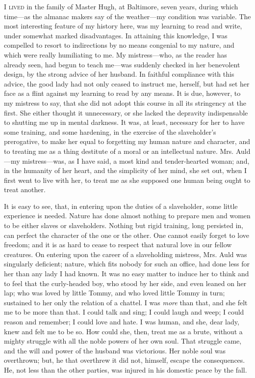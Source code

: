 \textsc{I lived} in the family of Master Hugh, at Baltimore, seven
years, during which time---as the almanac makers say of the weather---my
condition was variable. The most interesting feature of my history here,
was my learning to read and write, under somewhat marked disadvantages.
In attaining this knowledge, I was compelled to resort to indirections
by no means congenial to my nature, and which were really humiliating to
me. My mistress---who, as the reader has already seen, had begun to
teach me---was suddenly checked in her benevolent design, by the strong
advice of her husband. In faithful compliance with this advice, the good
lady had not only ceased to instruct me, herself, but had set her face
as a flint against my learning to read by any means. It is due,
{\protect\hypertarget{152}{}{}}however, to my mistress to say, that she
did not adopt this course in all its stringency at the first. She either
thought it unnecessary, or she lacked the depravity indispensable to
shutting me up in mental darkness. It was, at least, necessary for her
to have some training, and some hardening, in the exercise of the
slaveholder's prerogative, to make her equal to forgetting my human
nature and character, and to treating me as a thing destitute of a moral
or an intellectual nature. Mrs. Auld---my mistress---was, as I have
said, a most kind and tender-hearted woman; and, in the humanity of her
heart, and the simplicity of her mind, she set out, when I first went to
live with her, to treat me as she supposed one human being ought to
treat another.

It is easy to see, that, in entering upon the duties of a slaveholder,
some little experience is needed. Nature has done almost nothing to
prepare men and women to be either slaves or slaveholders. Nothing but
rigid training, long persisted in, can perfect the character of the one
or the other. One cannot easily forget to love freedom; and it is as
hard to cease to respect that natural love in our fellow creatures. On
entering upon the career of a slaveholding mistress, Mrs. Auld was
singularly deficient; nature, which fits nobody for such an office, had
done less for her than any lady I had known. It was no easy matter to
induce her to think and to feel that the curly-headed boy, who stood by
her side, and even leaned on her lap; who was loved by little Tommy, and
who loved little Tommy in turn; sustained to her only the relation of a
chattel. I was \emph{more} than that, and she felt
{\protect\hypertarget{153}{}{}}me to be more than that. I could talk and
sing; I could laugh and weep; I could reason and remember; I could love
and hate. I was human, and she, dear lady, knew and felt me to be so.
How could she, then, treat me as a brute, without a mighty struggle with
all the noble powers of her own soul. That struggle came, and the will
and power of the husband was victorious. Her noble soul was overthrown;
but, he that overthrew it did not, himself, escape the consequences. He,
not less than the other parties, was injured in his domestic peace by
the fall.

